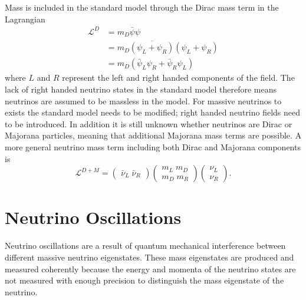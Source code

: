 Mass is included in the standard model through the Dirac mass term in the
Lagrangian
\begin{align}
	\mathcal{L}^{D} &= m_D \bar{\psi} \psi \\
	&= m_D \overline{(\psi_L + \psi_R)}(\psi_L + \psi_R) \\ 
	&= m_D(\bar{\psi}_L \psi_R + \bar{\psi}_R \psi_L)
\end{align}
where $L$ and $R$ represent the left and right handed components of the field.
The lack of right handed neutrino states in the standard model therefore means
neutrinos are assumed to be massless in the model. For massive neutrinos to
exists the standard model needs to be modified; right handed neutrino fields
need to be introduced. In addition it is still unknown whether neutrinos are
Dirac or Majorana particles, meaning that additional Majorana mass terms are
possible. A more general neutrino mass term including both Dirac and Majorana
components is 
\begin{equation}
	\mathcal{L}^{D+M} = 
	\begin{pmatrix} \bar{\nu}_L \; \bar{\nu}_R \end{pmatrix} 
	\begin{pmatrix} m_L \; m_D \\ m_D \; m_R \end{pmatrix} 
	\begin{pmatrix} \nu_L \\ \nu_R \end{pmatrix}.
\end{equation}

\section{Neutrino Oscillations} \label{nu_osc}

Neutrino oscillations are a result of quantum mechanical interference between
different massive neutrino eigenstates. These mass eigenstates are produced and 
measured coherently because the energy and momenta of the neutrino states are
not measured with enough precision to distinguish the mass eigenstate of the
neutrino.

